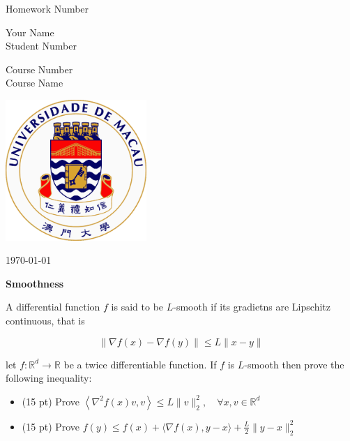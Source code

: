 \documentclass[10pt, a4paper]{article}
\newcommand\course{Course Number\\Course Name}                      %
\newcommand\hwnumber{Homework Number}                         %
\newcommand\Information{Your Name\\Student Number}           %
\begin{document}
\begin{titlepage}
    \begin{center}
        \vspace*{3cm}
            
        \Huge
         \hwnumber  
        
            
        \vspace{1.5cm}
        \Large
            
        \Information
            
        \vfill
        
        \course \ 
            
        \vspace{1.5cm}
            
        \includegraphics[width=0.4\textwidth]{um_badge.png}
        \\
        
        \Large
        
        \today
            
    \end{center}
\end{titlepage}


\newpage
\begin{Problem}
    \textbf{Smoothness} 
    
    A differential function $f$ is said to be $L$-smooth if its gradietns are Lipschitz continuous, that is
    
    $$
    \|\nabla f(x)-\nabla f(y)\| \leq L\|x-y\|
    $$
    
    let $f : \mathbb{R}^{d} \rightarrow \mathbb{R}$ be a twice differentiable function. If $f$ is $L$-smooth then prove the following inequality:
    
    \begin{itemize}
    	\item (15 pt) Prove $\left\langle\nabla^2 f(x) v, v\right\rangle \leq L\|v\|_2^2, \quad \forall x, v \in \mathbb{R}^d$
    	\item (15 pt) Prove	$f(y) \leq f(x)+\langle\nabla f(x), y-x\rangle+\frac{L}{2}\|y-x\|_2^2$
    \end{itemize}
\end{Problem}
    
\end{document}
